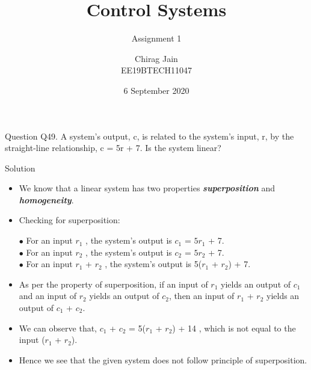 \documentclass{beamer}
\title{Control Systems}
\subtitle{Assignment 1}
\author{Chirag Jain \\ EE19BTECH11047}
\date{6 September 2020}
\begin{document}
\maketitle

\begin{frame}{Question}
Q49. A system’s output, c, is related to the system’s input,
r, by the straight-line relationship, c = 5r + 7. Is the
system linear?
\end{frame}

\begin{frame}{Solution}

\begin{itemize}
    \item We know that a linear system has two properties \textbf{\textit{superposition}} and \textbf{\textit{homogeneity}}.
    \item {Checking for superposition:}
    \begin{itemize}
        \subitem $\bullet$ {For an input \(r_1\) , the system's output is \(c_1\) = \(5r_1\) + 7.}\\
        \subitem $\bullet$ {For an input \(r_2\) , the system's output is \(c_2\) = \(5r_2\) + 7.}\\
        \subitem $\bullet$ {For an input \(r_1\) + \(r_2\) , the system's output is 5(\(r_1\) + \(r_2\)) + 7.}\\
    \end{itemize}
    \item As per the property of superposition, if an input of \(r_1\) yields an output of \(c_1\) and an input of \(r_2\) yields an output of \(c_2\), then an input of \(r_1\) + \(r_2\) yields an output of \(c_1\) + \(c_2\).\\
    \item We can observe that, \(c_1\) + \(c_2\) = 5(\(r_1\) + \(r_2\)) + 14 , which is not equal to the input (\(r_1\) + \(r_2\)).
    \item Hence we see that the given system does not follow principle of superposition.
\end{itemize}
\end{frame}
\end{document}

